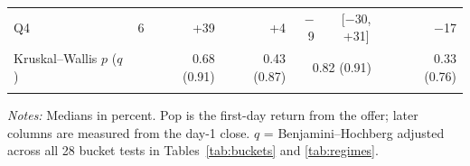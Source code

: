 \begin{table}[!htbp]
\begin{threeparttable}
\begin{tabular}{lrrrrcr}
\quad Q4 & 6 & +39 & +4 & $-$9 & [$-$30, +31] & $-$17 \\
\quad \footnotesize Kruskal--Wallis $p$ ($q$) & & \footnotesize 0.68 (0.91) & \footnotesize 0.43 (0.87) & \multicolumn{2}{c}{\footnotesize 0.82 (0.91)} & \footnotesize 0.33 (0.76) \\
\addlinespace
\bottomrule
\end{tabular}
\begin{tablenotes}[flushleft]\footnotesize
\item \textit{Notes:} Medians in percent. Pop is the first-day return from the offer; later columns are measured from the day-1 close. $q$ = Benjamini--Hochberg adjusted across all 28 bucket tests in Tables~\ref{tab:buckets} and \ref{tab:regimes}.
\end{tablenotes}
\end{threeparttable}

\end{table}
